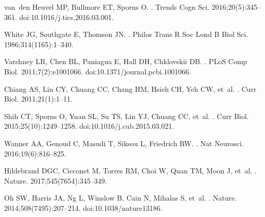 \documentclass[10pt,letterpaper]{article}
\begin{document}
{\nolinenumbers

%
%
%
\begin{thebibliography}{100}

van~den Heuvel MP, Bullmore ET, Sporns O.
.
\newblock Trends Cogn Sci. 2016;20(5):345--361.
\newblock doi:{10.1016/j.tics.2016.03.001}.


White JG, Southgate E, Thomson JN.
.
\newblock Philos Trans R Soc Lond B Biol Sci. 1986;314(1165):1--340.

Varshney LR, Chen BL, Paniagua E, Hall DH, Chklovskii DB.
.
\newblock PLoS Comp Biol. 2011;7(2):e1001066.
\newblock doi:{10.1371/journal.pcbi.1001066}.

Chiang AS, Lin CY, Chuang CC, Chang HM, Hsieh CH, Yeh CW, et~al.
.
\newblock Curr Biol. 2011;21(1):1--11.

Shih CT, Sporns O, Yuan SL, Su TS, Lin YJ, Chuang CC, et~al.
.
\newblock Curr Biol. 2015;25(10):1249--1258.
\newblock doi:{10.1016/j.cub.2015.03.021}.

Wanner AA, Genoud C, Masudi T, Siksou L, Friedrich RW.
.
\newblock Nat Neurosci. 2016;19(6):816--825.

Hildebrand DGC, Cicconet M, Torres RM, Choi W, Quan TM, Moon J, et~al.
.
\newblock Nature. 2017;545(7654):345--349.

Oh SW, Harris JA, Ng L, Winslow B, Cain N, Mihalas S, et~al.
.
\newblock Nature. 2014;508(7495):207--214.
\newblock doi:{10.1038/nature13186}.


\end{thebibliography}}
\end{document}
